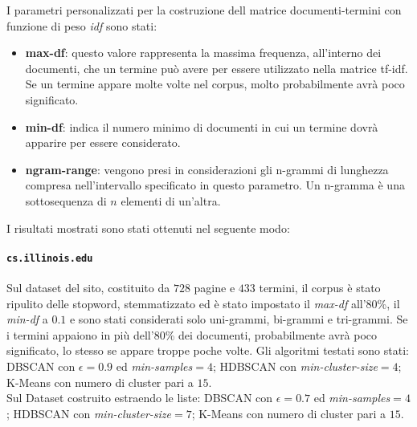 I parametri personalizzati per la costruzione dell matrice documenti-termini con funzione di peso \textit{idf} sono stati:
\begin{itemize}
\item \textbf{max-df}: questo valore rappresenta la massima frequenza, all'interno dei documenti, che un termine può avere per essere utilizzato nella matrice tf-idf. Se un termine appare molte volte nel corpus, molto probabilmente avrà poco significato.
\item \textbf{min-df}: indica il numero minimo di documenti in cui un termine dovrà apparire per essere considerato.
\item \textbf{ngram-range}: vengono presi in considerazioni gli n-grammi di lunghezza compresa nell'intervallo specificato in questo parametro. Un n-gramma è una sottosequenza  di $n$ elementi di un'altra.
\end{itemize}

I risultati mostrati sono stati ottenuti nel seguente modo:
\paragraph{\texttt{cs.illinois.edu}}
Sul dataset del sito, costituito da $728$ pagine e $433$ termini, il corpus è stato ripulito delle stopword, stemmatizzato ed è stato impostato il \textit{max-df} all'80\%, il \textit{min-df} a $0.1$ e sono stati considerati solo uni-grammi, bi-grammi e tri-grammi. Se i termini appaiono in più dell'80\% dei documenti, probabilmente avrà poco significato, lo stesso se appare troppe poche volte. Gli algoritmi testati sono stati: DBSCAN con $\epsilon = 0.9$ ed \textit{min-samples}$ = 4$; HDBSCAN con \textit{min-cluster-size}$=4$; K-Means con numero di cluster pari a $15$. \\Sul Dataset costruito estraendo le liste: DBSCAN con $\epsilon = 0.7$ ed \textit{min-samples}$ = 4$; HDBSCAN con \textit{min-cluster-size}$=7$; K-Means con numero di cluster pari a $15$. 

